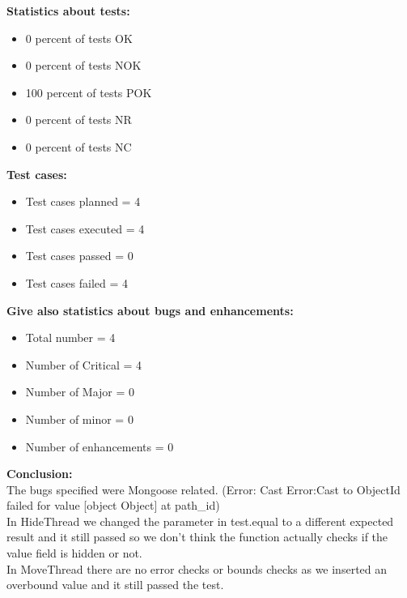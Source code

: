 \begin{flushleft}
\begin{flushleft}
\textbf{Statistics about tests:}
\begin{itemize}
  	\item  0 percent of tests OK
  	\item  0 percent of tests NOK
   	\item 100 percent of tests POK
    	\item 	0 percent of tests NR
        	\item 	0 percent of tests NC
 \end{itemize}

\textbf{Test cases:}
\begin{itemize}
  	\item Test cases planned = 4 
  	\item  Test cases executed = 4
   	\item Test cases passed = 0
    	\item Test cases failed = 4
 \end{itemize}

\textbf{Give also statistics about bugs and enhancements:}
\begin{itemize}
  	\item 	Total number = 4
  	\item  	Number of Critical = 4
   	\item 	Number of Major = 0
    	\item Number of minor = 0
      	\item Number of enhancements = 0
 \end{itemize}
 \end{flushleft}
 
\begin{flushleft}
\textbf{Conclusion:}\\
The bugs specified were Mongoose related. (Error: Cast Error:Cast to ObjectId failed for value [object Object] at path\_id)\\
In HideThread we changed the parameter in test.equal to a different expected result and it still passed so we don’t think the function actually checks if the value field is hidden or not.\\
In MoveThread there are no error checks or bounds checks as we inserted an overbound value and it still passed the test.
\end{flushleft}

\end{flushleft}

